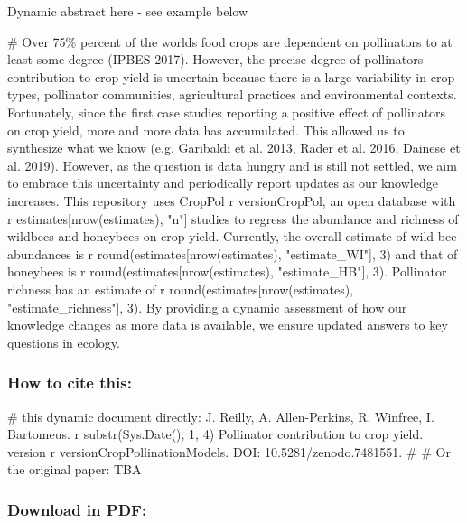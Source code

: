 \documentclass[
  letterpaper,
  DIV=11,
  numbers=noendperiod]{scrartcl}
\newenvironment{Shaded}{\begin{snugshade}}{\end{snugshade}}
\newcommand{\CommentTok}[1]{\textcolor[rgb]{0.37,0.37,0.37}{#1}}
\begin{document}
Dynamic abstract here - see example below

\begin{Shaded}
\begin{Highlighting}[]
\CommentTok{\# Over 75\% percent of the world\textquotesingle{}s food crops are dependent on pollinators to at least some degree (IPBES 2017). However, the precise degree of pollinators contribution to crop yield is uncertain because there is a large variability in crop types, pollinator communities, agricultural practices and environmental contexts. Fortunately, since the first case studies reporting a positive effect of pollinators on crop yield, more and more data has accumulated. This allowed us to synthesize what we know (e.g. Garibaldi et al. 2013, Rader et al. 2016, Dainese et al. 2019). However, as the question is data hungry and is still not settled, we aim to embrace this uncertainty and periodically report updates as our knowledge increases. This repository uses CropPol r versionCropPol, an open database with r estimates[nrow(estimates), "n"] studies to regress the abundance and richness of wildbees and honeybees on crop yield. Currently, the overall estimate of wild bee abundances is r round(estimates[nrow(estimates), "estimate\_WI"], 3) and that of honeybees is r round(estimates[nrow(estimates), "estimate\_HB"], 3). Pollinator richness has an estimate of r round(estimates[nrow(estimates), "estimate\_richness"], 3). By providing a dynamic assessment of how our knowledge changes as more data is available, we ensure updated answers to key questions in ecology.}
\end{Highlighting}
\end{Shaded}

\subsubsection{How to cite this:}\label{how-to-cite-this}

\begin{Shaded}
\begin{Highlighting}[]
\CommentTok{\# this dynamic document directly: J. Reilly, A. Allen{-}Perkins, R. Winfree, I. Bartomeus. r substr(Sys.Date(), 1, 4) Pollinator contribution to crop yield. version r versionCropPollinationModels. DOI: 10.5281/zenodo.7481551.}
\CommentTok{\# }
\CommentTok{\# Or the original paper: TBA}
\end{Highlighting}
\end{Shaded}

\subsubsection{Download in PDF:}\label{download-in-pdf}
\end{document}
